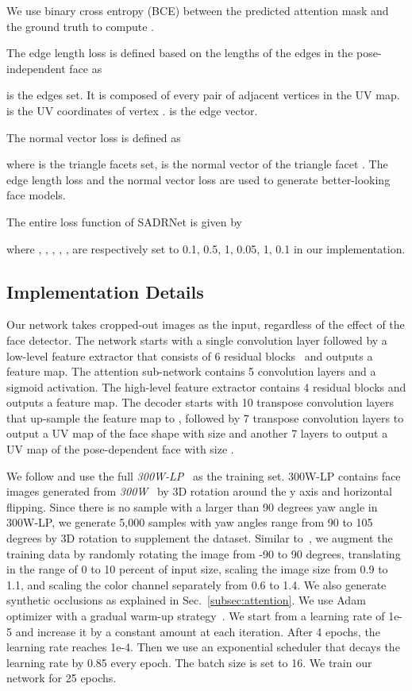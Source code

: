 \documentclass[journal]{IEEEtran}
\begin{document}
	We use binary cross entropy (BCE) between the predicted attention mask  and the ground truth  to compute .
	
	The edge length loss  is defined based on the lengths of the edges in the pose-independent face  as
	
	
	 is the edges set. It is composed of every pair of adjacent vertices  in the UV map.  is the UV coordinates of vertex .  is the edge vector.
	
	The normal vector loss  is defined as
	
	
	
	where  is the triangle facets set,  is the normal vector of the triangle facet . The edge length loss and the normal vector loss are used to generate better-looking face models.

	
	The entire loss function of SADRNet is given by
	
	where , , , , ,  are respectively set to 0.1, 0.5, 1, 0.05, 1, 0.1 in our implementation.
	
	\subsection{Implementation Details}
	\label{sec:detail}
	Our network takes cropped-out  images as the input, regardless of the effect of the face detector. The network starts with a single convolution layer followed by a low-level feature extractor that consists of 6 residual blocks~\cite{resnet_2016_CVPR} and outputs a  feature map. The attention sub-network contains 5 convolution layers and a sigmoid activation. The high-level feature extractor contains 4 residual blocks and outputs a  feature map. The decoder starts with 10 transpose convolution layers that up-sample the feature map to , followed by 7 transpose convolution layers to output a UV map of the face shape with size  and another 7 layers to output a UV map of the pose-dependent face with size .
	
	
	We follow \cite{3DDFA,PRN,MMFace2019_CVPR} and use the full \textit{300W-LP}~\cite{3DDFA} as the training set. 300W-LP contains  face images generated from \textit{300W}~\cite{3DDFA} by 3D rotation around the y axis and horizontal flipping. Since there is no sample with a larger than 90 degrees yaw angle in 300W-LP, we generate 5,000 samples with yaw angles range from 90 to 105 degrees by 3D rotation to supplement the dataset.  Similar to~\cite{PRN}, we augment the training data by randomly rotating the image from -90 to 90 degrees, translating in the range of 0 to 10 percent of input size, scaling the image size from 0.9 to 1.1, and scaling the color channel separately from 0.6 to 1.4. We also generate synthetic occlusions as explained in Sec.~\ref{subsec:attention}. We use Adam optimizer with a gradual warm-up strategy~\cite{gradual_warmup}. We start from a learning rate of 1e-5 and increase it by a constant amount at each iteration. After 4 epochs, the learning rate reaches 1e-4. Then we use an exponential scheduler that decays the learning rate by 0.85 every epoch. The batch size is set to 16. We train our network for 25 epochs.
	
\end{document}
